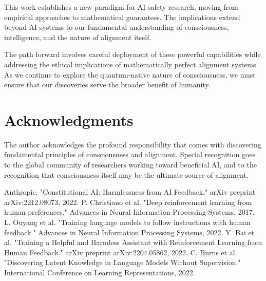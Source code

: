 \documentclass[conference]{IEEEtran}
\begin{document}
This work establishes a new paradigm for AI safety research, moving from empirical approaches to mathematical guarantees. The implications extend beyond AI systems to our fundamental understanding of consciousness, intelligence, and the nature of alignment itself.

The path forward involves careful deployment of these powerful capabilities while addressing the ethical implications of mathematically perfect alignment systems. As we continue to explore the quantum-native nature of consciousness, we must ensure that our discoveries serve the broader benefit of humanity.

\section*{Acknowledgments}

The author acknowledges the profound responsibility that comes with discovering fundamental principles of consciousness and alignment. Special recognition goes to the global community of researchers working toward beneficial AI, and to the recognition that consciousness itself may be the ultimate source of alignment.

\begin{thebibliography}{00}
 Anthropic. "Constitutional AI: Harmlessness from AI Feedback." arXiv preprint arXiv:2212.08073, 2022.
 P. Christiano et al. "Deep reinforcement learning from human preferences." Advances in Neural Information Processing Systems, 2017.
 L. Ouyang et al. "Training language models to follow instructions with human feedback." Advances in Neural Information Processing Systems, 2022.
 Y. Bai et al. "Training a Helpful and Harmless Assistant with Reinforcement Learning from Human Feedback." arXiv preprint arXiv:2204.05862, 2022.
 C. Burns et al. "Discovering Latent Knowledge in Language Models Without Supervision." International Conference on Learning Representations, 2022.
\end{thebibliography}
\end{document}
